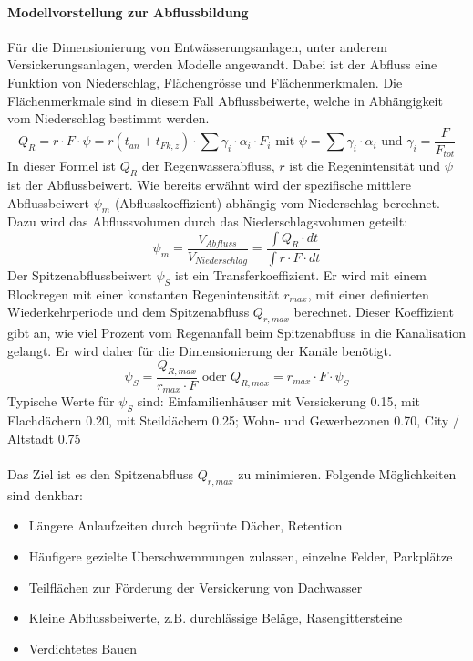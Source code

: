 \documentclass[9pt, openright=false]{scrartcl}
\begin{document}
\paragraph{Modellvorstellung zur Abflussbildung} Für die Dimensionierung von Entwässerungsanlagen, unter anderem Versickerungsanlagen, werden Modelle angewandt. Dabei ist der Abfluss eine Funktion von Niederschlag, Flächengrösse und Flächenmerkmalen. Die Flächenmerkmale sind in diesem Fall Abflussbeiwerte, welche in Abhängigkeit vom Niederschlag bestimmt werden. \[Q_R = r \cdot F \cdot \psi = r(t_{an} + t_{Fk,z}) \cdot \sum \gamma_i \cdot \alpha_i \cdot F_i \textrm{ mit } \psi = \sum \gamma_i \cdot \alpha_i \textrm{ und }\gamma_i = \dfrac{F}{F_{tot}}\] In dieser Formel ist $Q_R$ der Regenwasserabfluss, $r$ ist die Regenintensität und $\psi$ ist der Abflussbeiwert. Wie bereits erwähnt wird der spezifische mittlere Abflussbeiwert $\psi_m$ (Abflusskoeffizient) abhängig vom Niederschlag berechnet. Dazu wird das Abflussvolumen durch das Niederschlagsvolumen geteilt:
\[\psi_m = \dfrac{V_{Abfluss}}{V_{Niederschlag}} = \dfrac{\int Q_R \cdot dt}{\int r \cdot F \cdot dt}\]
Der Spitzenabflussbeiwert $\psi_S$ ist ein Transferkoeffizient. Er wird mit einem Blockregen mit einer konstanten Regenintensität $r_{max}$, mit einer definierten Wiederkehrperiode und dem Spitzenabfluss $Q_{r,max}$ berechnet. Dieser Koeffizient gibt an, wie viel Prozent vom Regenanfall beim Spitzenabfluss in die Kanalisation gelangt. Er wird daher für die Dimensionierung der Kanäle benötigt. \[\psi_S = \dfrac{Q_{R,max}}{r_{max} \cdot F} \textrm{  oder  } Q_{R,max} = r_{max} \cdot F \cdot \psi_S\]
Typische Werte für $\psi_S$ sind: Einfamilienhäuser mit Versickerung 0.15, mit Flachdächern 0.20, mit Steildächern 0.25; Wohn- und Gewerbezonen 0.70, City / Altstadt 0.75\\ \\
Das Ziel ist es den Spitzenabfluss $Q_{r,max}$ zu minimieren. Folgende Möglichkeiten sind denkbar:
\begin{itemize}
\item Längere Anlaufzeiten durch begrünte Dächer, Retention
\item Häufigere gezielte Überschwemmungen zulassen, einzelne Felder, Parkplätze
\item Teilflächen zur Förderung der Versickerung von Dachwasser
\item Kleine Abflussbeiwerte, z.B. durchlässige Beläge, Rasengittersteine
\item Verdichtetes Bauen
\end{itemize}
\end{document}

